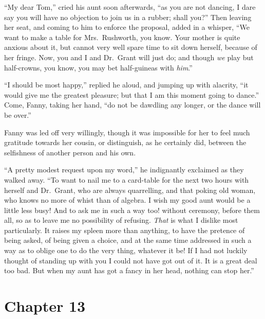 ``My dear Tom,'' cried his aunt soon afterwards, ``as you
are not dancing, I dare say you will have no objection
to join us in a rubber; shall you?''  Then leaving her seat,
and coming to him to enforce the proposal, added in
a whisper, ``We want to make a table for Mrs.\ Rushworth,
you know.  Your mother is quite anxious about it,
but cannot very well spare time to sit down herself,
because of her fringe.  Now, you and I and Dr.\ Grant will
just do; and though \emph{we} play but half-crowns, you know,
you may bet half-guineas with \emph{him}.''

``I should be most happy,'' replied he aloud, and jumping up
with alacrity, ``it would give me the greatest pleasure;
but that I am this moment going to dance.''  Come, Fanny,
taking her hand, ``do not be dawdling any longer,
or the dance will be over.''

Fanny was led off very willingly, though it was impossible
for her to feel much gratitude towards her cousin,
or distinguish, as he certainly did, between the selfishness
of another person and his own.

``A pretty modest request upon my word,'' he indignantly
exclaimed as they walked away.  ``To want to nail me
to a card-table for the next two hours with herself and
Dr.\ Grant, who are always quarrelling, and that poking
old woman, who knows no more of whist than of algebra.
I wish my good aunt would be a little less busy!  And to ask
me in such a way too! without ceremony, before them all,
so as to leave me no possibility of refusing.  \emph{That} is
what I dislike most particularly.  It raises my spleen
more than anything, to have the pretence of being asked,
of being given a choice, and at the same time addressed
in such a way as to oblige one to do the very thing,
whatever it be!  If I had not luckily thought of standing
up with you I could not have got out of it.  It is a great
deal too bad.  But when my aunt has got a fancy in her head,
nothing can stop her.''



\chapter{Chapter 13}

